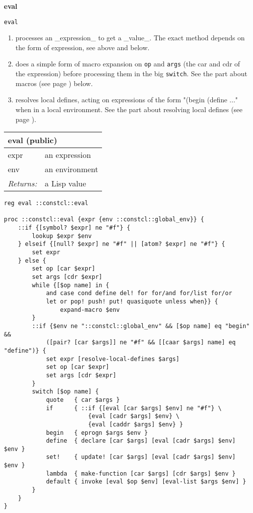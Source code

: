 \documentclass{report}
\begin{document}
\textbf{eval}


\texttt{eval}

\begin{enumerate}
\item  processes an \_expression\_ to get a \_value\_. The exact method depends on the form of expression, see above and below.
\item  does a simple form of macro expansion on \texttt{op} and \texttt{args} (the car and cdr of the expression) before processing them in the big \texttt{switch}. See the part about macros (see page \pageref{macros}) below.
\item  resolves local defines, acting on expressions of the form "(begin (define ..." when in a local environment. See the part about resolving local defines (see page \pageref{resolving-local-defines}).
\end{enumerate}
\begin{tabular}{ |l l| }
\hline
\multicolumn{2}{|l|}{eval (public)} \\
\hline
expr & an expression \\
env & an environment \\
\textit{Returns:} & a Lisp value \\
\hline
\end{tabular}

\noindent\makebox[\linewidth]{\rule{\linewidth}{0.4pt}}
\begin{lstlisting}
reg eval ::constcl::eval
 
proc ::constcl::eval {expr {env ::constcl::global_env}} {
    ::if {[symbol? $expr] ne "#f"} {
        lookup $expr $env
    } elseif {[null? $expr] ne "#f" || [atom? $expr] ne "#f"} {
        set expr
    } else {
        set op [car $expr]
        set args [cdr $expr]
        while {[$op name] in {
            and case cond define del! for for/and for/list for/or
            let or pop! push! put! quasiquote unless when}} {
                expand-macro $env
        }
        ::if {$env ne "::constcl::global_env" && [$op name] eq "begin" &&
            ([pair? [car $args]] ne "#f" && [[caar $args] name] eq "define")} {
            set expr [resolve-local-defines $args]
            set op [car $expr]
            set args [cdr $expr]
        }
        switch [$op name] {
            quote   { car $args }
            if      { ::if {[eval [car $args] $env] ne "#f"} \
                        {eval [cadr $args] $env} \
                        {eval [caddr $args] $env} }
            begin   { eprogn $args $env }
            define  { declare [car $args] [eval [cadr $args] $env] $env }
            set!    { update! [car $args] [eval [cadr $args] $env] $env }
            lambda  { make-function [car $args] [cdr $args] $env }
            default { invoke [eval $op $env] [eval-list $args $env] }
        }
    }
}
\end{lstlisting}
\noindent\makebox[\linewidth]{\rule{\linewidth}{0.4pt}}
\end{document}
